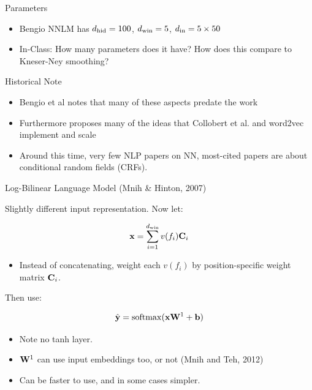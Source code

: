 \documentclass{beamer}
\begin{document}
\begin{frame}{Parameters}
  \begin{itemize}
  \item Bengio NNLM has ${d_{\mathrm{hid}}}=100$, ${d_{\mathrm{win}}}=5$, ${d_{\mathrm{in}}} = 5 \times 50 $ 
    \air 
    
  \item In-Class: How many parameters does it have? How does this compare to Kneser-Ney smoothing?
  \end{itemize}
\end{frame}

\begin{frame}{Historical Note}
  \begin{itemize}
  \item Bengio et al notes that many of these aspects predate the work
    \air 
  \item Furthermore proposes many of the ideas that Collobert et al. and word2vec implement and scale 
    \air 
  \item Around this time, very few NLP papers on  NN, most-cited papers are about conditional random fields (CRFs). 
  \end{itemize}
\end{frame}


\begin{frame}{Log-Bilinear Language Model (Mnih \& Hinton, 2007)}

Slightly different input representation. Now let:

\[ \mathbf{x} = \sum_{i=1}^{{d_{\mathrm{win}}}} v(f_i) \mathbf{C}_i \]

\begin{itemize}
\item Instead of concatenating, weight each $v(f_i)$ by position-specific weight matrix $\mathbf{C}_i$.
\end{itemize}

Then use:

  \[\hat{\boldy} = \softmax(\boldx\boldW^1 + \boldb)\]

  \begin{itemize}
  \item Note no tanh layer.
  \item $\mathbf{W}^1$ can use input embeddings too, or not (Mnih and Teh, 2012)
  \item Can be faster to use, and in some cases simpler.
  \end{itemize}
\end{frame}
\end{document}
